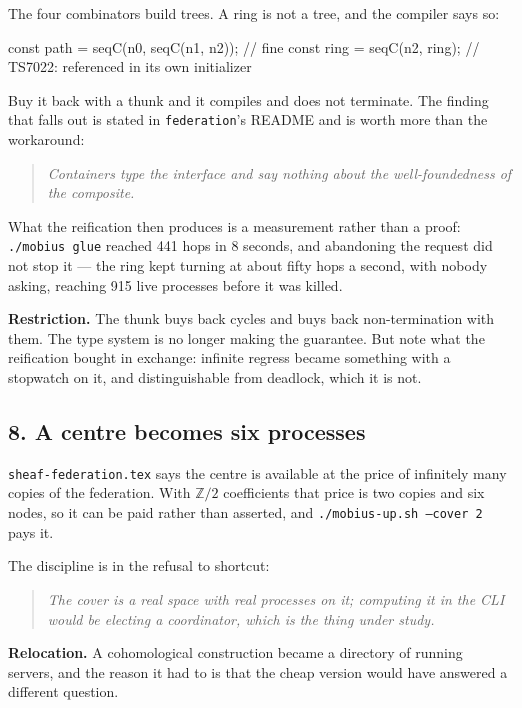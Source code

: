 \documentclass[11pt,a4paper]{article}
\begin{document}
The four combinators build trees. A ring is not a tree, and the compiler says
so:

\begin{term}
const path = seqC(n0, seqC(n1, n2));   // fine
const ring = seqC(n2, ring);           // TS7022: referenced in its own initializer
\end{term}

Buy it back with a thunk and it compiles and does not terminate. The finding
that falls out is stated in \texttt{federation}'s README and is worth more than
the workaround:

\begin{quote}
\emph{Containers type the interface and say nothing about the well-foundedness
of the composite.}
\end{quote}

What the reification then produces is a measurement rather than a proof:
\texttt{./mobius glue} reached 441 hops in 8 seconds, and abandoning the request
did not stop it --- the ring kept turning at about fifty hops a second, with
nobody asking, reaching 915 live processes before it was killed.

\textbf{Restriction.} The thunk buys back cycles and buys back non-termination
with them. The type system is no longer making the guarantee. But note what the
reification bought in exchange: infinite regress became something with a
stopwatch on it, and distinguishable from deadlock, which it is not.

\subsection*{8. A centre becomes six processes}

\texttt{sheaf-federation.tex} says the centre is available at the price of
infinitely many copies of the federation. With $\mathbb{Z}/2$ coefficients that
price is two copies and six nodes, so it can be paid rather than asserted, and
\texttt{./mobius-up.sh --cover 2} pays it.

The discipline is in the refusal to shortcut:

\begin{quote}
\emph{The cover is a real space with real processes on it; computing it in the
CLI would be electing a coordinator, which is the thing under study.}
\end{quote}

\textbf{Relocation.} A cohomological construction became a directory of
running servers, and the reason it had to is that the cheap version would have
answered a different question.
\end{document}
